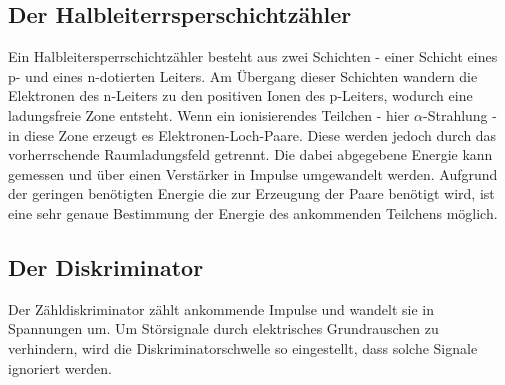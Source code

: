 \subsection{Der Halbleiterrsperschichtzähler}
Ein Halbleitersperrschichtzähler besteht aus zwei Schichten - einer Schicht eines p- und eines n-dotierten Leiters. Am Übergang dieser Schichten wandern die Elektronen des n-Leiters zu den positiven Ionen des p-Leiters, wodurch eine ladungsfreie Zone entsteht. Wenn ein ionisierendes Teilchen - hier $\alpha$-Strahlung - in diese Zone erzeugt es Elektronen-Loch-Paare. Diese werden jedoch durch das vorherrschende Raumladungsfeld getrennt. Die dabei abgegebene Energie kann gemessen und über einen Verstärker in Impulse umgewandelt werden. Aufgrund der geringen benötigten Energie die zur Erzeugung der Paare benötigt wird, ist eine sehr genaue Bestimmung der Energie des ankommenden Teilchens möglich.

\subsection{Der Diskriminator}
Der Zähldiskriminator zählt ankommende Impulse und wandelt sie in Spannungen um.
Um Störsignale durch elektrisches Grundrauschen zu verhindern, wird die Diskriminatorschwelle so eingestellt, dass solche Signale ignoriert werden.